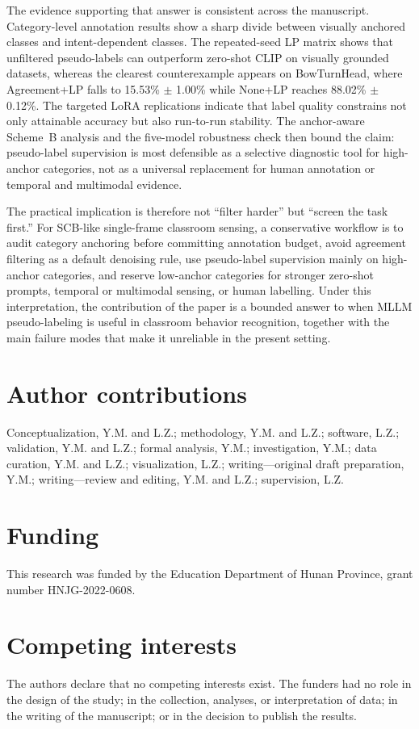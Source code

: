 \documentclass[10pt,letterpaper]{article}
\begin{document}
The evidence supporting that answer is consistent across the
manuscript.
Category-level annotation results show a sharp divide between visually
anchored classes and intent-dependent classes.
The repeated-seed LP matrix shows that unfiltered pseudo-labels can
outperform zero-shot CLIP on visually grounded datasets, whereas the
clearest counterexample appears on BowTurnHead, where Agreement+LP
falls to 15.53\% $\pm$ 1.00\% while None+LP reaches 88.02\%
$\pm$ 0.12\%.
The targeted LoRA replications indicate that label quality constrains
not only attainable accuracy but also run-to-run stability.
The anchor-aware Scheme~B analysis and the five-model robustness check
then bound the claim: pseudo-label supervision is most defensible as a
selective diagnostic tool for high-anchor categories, not as a
universal replacement for human annotation or temporal and multimodal
evidence.

The practical implication is therefore not ``filter harder'' but
``screen the task first.''
For SCB-like single-frame classroom sensing, a conservative workflow is
to audit category anchoring before committing annotation budget,
avoid agreement filtering as a default denoising rule,
use pseudo-label supervision mainly on high-anchor categories,
and reserve low-anchor categories for stronger zero-shot prompts,
temporal or multimodal sensing, or human labelling.
Under this interpretation, the contribution of the paper is a bounded
answer to when MLLM pseudo-labeling is useful in classroom behavior
recognition, together with the main failure modes that make it
unreliable in the present setting.

\section*{Author contributions}
Conceptualization, Y.M. and L.Z.; methodology, Y.M. and L.Z.; software,
L.Z.; validation, Y.M. and L.Z.; formal analysis, Y.M.; investigation,
Y.M.; data curation, Y.M. and L.Z.; visualization, L.Z.; writing---original
draft preparation, Y.M.; writing---review and editing, Y.M. and L.Z.;
supervision, L.Z.

\section*{Funding}
This research was funded by the Education Department of Hunan Province,
grant number HNJG-2022-0608.

\section*{Competing interests}
The authors declare that no competing interests exist. The funders had no role
in the design of the study; in the collection, analyses, or
interpretation of data; in the writing of the manuscript; or in the
decision to publish the results.
\end{document}
